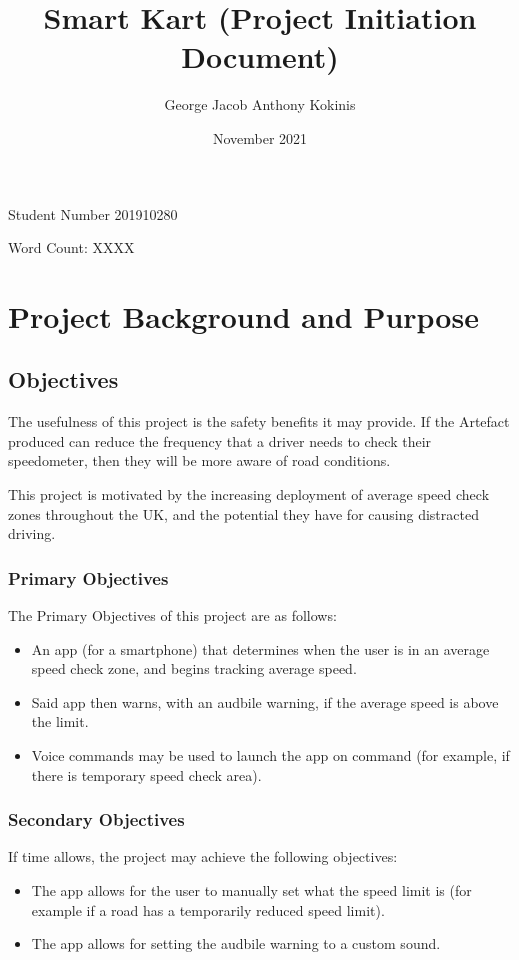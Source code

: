 \documentclass[11pt, a4paper, notitlepage]{report}
\title{Smart Kart (Project Initiation Document)}
\date{November 2021}
\author{George Jacob Anthony Kokinis}
\begin{document}
\maketitle
\begin{center}
    Student Number 201910280

    Word Count: XXXX
\end{center}
\newpage
\tableofcontents

\chapter{Project Background and Purpose}
\section{Objectives}
The usefulness of this project is the safety benefits it may provide. If the 
Artefact produced can reduce the frequency that a driver needs to check their 
speedometer, then they will be more aware of road conditions.

This project is motivated by the increasing deployment of average speed check zones 
throughout the UK, and the potential they have for causing distracted driving.

\subsection{Primary Objectives} \label{PrimaryObjectives}
The Primary Objectives of this project are as follows:
\begin{itemize}
    \item An app (for a smartphone) that determines when the user is in an 
average speed check zone, and begins tracking average speed.
    \item Said app then warns, with an audbile warning, if the average speed 
is above the limit.
    \item Voice commands may be used to launch the app on command (for 
example, if there is temporary speed check area).
\end{itemize}
\subsection{Secondary Objectives}
If time allows, the project may achieve the following objectives:
\begin{itemize}
    \item The app allows for the user to manually set what the speed limit is 
(for example if a road has a temporarily reduced speed limit).
    \item The app allows for setting the audbile warning to a custom sound.
\end{itemize}
\end{document}
